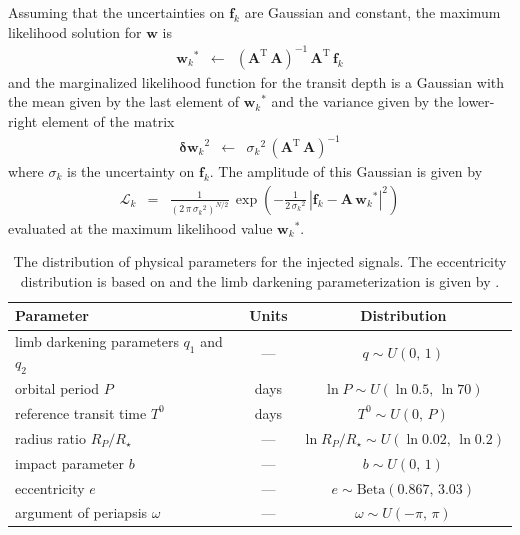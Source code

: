 \documentclass[12pt,preprint]{aastex}
\newcommand{\tablabel}[1]{\label{tab:#1}}
\newcommand{\eqlabel}[1]{\label{eq:#1}}
\newcommand{\T}{\ensuremath{\mathrm{T}}}
\newcommand{\bvec}[1]{{\ensuremath{\boldsymbol{#1}}}}
\newcommand{\period}{{\ensuremath{P}}}
\newcommand{\phase}{{\ensuremath{T^0}}}
\newcommand{\impact}{{\ensuremath{b}}}
\newcommand{\ecc}{{\ensuremath{e}}}
\newcommand{\pomega}{{\ensuremath{\omega}}}
\begin{document}
Assuming that the uncertainties on $\bvec{f}_k$ are Gaussian and constant,
the maximum likelihood solution for \bvec{w} is
\begin{eqnarray}
{\bvec{w}_k}^* &\gets& \left( \bvec{A}^\T\,\bvec{A} \right)^{-1}\,
                       \bvec{A}^\T\,\bvec{f}_k
\end{eqnarray}
and the marginalized likelihood function for the transit depth is a Gaussian
with the mean given by the last element of ${\bvec{w}_k}^*$ and the variance
given by the lower-right element of the matrix
\begin{eqnarray}
{\bvec{\delta w}_k}^2 &\gets& {\sigma_k}^2 \,
            \left( \bvec{A}^\T\,\bvec{A} \right)^{-1}
\end{eqnarray}
where $\sigma_k$ is the uncertainty on $\bvec{f}_k$.
The amplitude of this Gaussian is given by
\begin{eqnarray}\eqlabel{depth-likelihood}
\mathcal{L}_k &=& \frac{1}{(2\,\pi\,{\sigma_k}^2)^{N/2}}\,\exp\left(
-\frac{1}{2\,{\sigma_k}^2}\,
\left| \bvec{f}_k - \bvec{A}\,{\bvec{w}_k}^* \right|^2
\right)
\end{eqnarray}
evaluated at the maximum likelihood value ${\bvec{w}_k}^*$.


\clearpage

\clearpage



\clearpage

\begin{table}[p]
\begin{center}
\begin{tabular}{lcc}
\toprule
Parameter & Units & Distribution \\
\midrule

limb darkening parameters $q_1$ and $q_2$ & --- & $q \sim U(0,\,1)$ \\
orbital period \period & days & $\ln \period \sim U(\ln 0.5,\,\ln 70)$ \\
reference transit time \phase & days & $\phase \sim U(0,\,\period)$ \\
radius ratio $R_P/R_\star$ & --- & $\ln R_P/R_\star \sim U(\ln 0.02,\,\ln 0.2)$ \\
impact parameter \impact & --- & $\impact \sim U(0,\,1)$ \\
eccentricity \ecc & --- & $\ecc \sim \mathrm{Beta}(0.867,\,3.03)$ \\
argument of periapsis \pomega & --- & $\pomega \sim U(-\pi,\,\pi)$ \\

\bottomrule
\end{tabular}
\end{center}
\caption{%
The distribution of physical parameters for the injected signals.
The eccentricity distribution is based on \citet{Kipping:2013} and the
limb darkening parameterization is given by \citet{Kipping:2013a}.
\tablabel{dist}}
\end{table}
\end{document}
